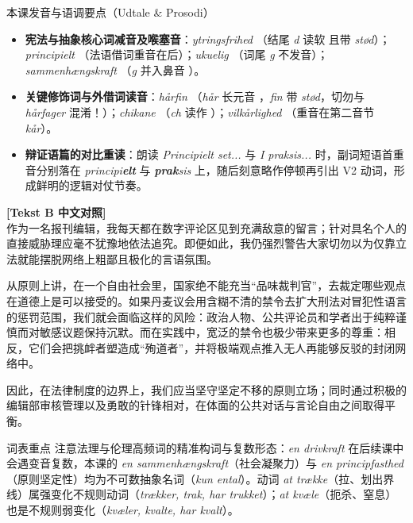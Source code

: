 \begin{tipbox}{本课发音与语调要点（Udtale \& Prosodi）}
\begin{itemize}
  \item \textbf{宪法与抽象核心词减音及喉塞音}：\textit{ytringsfrihed} （结尾 \textit{d} 读软  且带 \textit{stød}）；\textit{principielt} （法语借词重音在后）；\textit{ukuelig} （词尾 \textit{g} 不发音）；\textit{sammenhængskraft} （\textit{g} 并入鼻音 ）。
  \item \textbf{关键修饰词与外借词读音}：\textit{hårfin} （\textit{hår} 长元音 ，\textit{fin} 带 \textit{stød}，切勿与 \textit{hårfager} 混淆！）；\textit{chikane} （\textit{ch} 读作 ）；\textit{vilkårlighed} （重音在第二音节 \textit{kår}）。
  \item \textbf{辩证语篇的对比重读}：朗读 \textit{Principielt set...} 与 \textit{I praksis...} 时，副词短语首重音分别落在 \textit{principi\textbf{elt}} 与 \textit{\textbf{prak}sis} 上，随后刻意略作停顿再引出 V2 动词，形成鲜明的逻辑对仗节奏。
\end{itemize}
\end{tipbox}

\begin{transbox}
\small
\textbf{\color{NCDTeal}[Tekst B 中文对照]}\\
作为一名报刊编辑，我每天都在数字评论区见到充满敌意的留言；针对具名个人的直接威胁理应毫不犹豫地依法追究。即便如此，我仍强烈警告大家切勿以为仅靠立法就能摆脱网络上粗鄙且极化的言语氛围。

从原则上讲，在一个自由社会里，国家绝不能充当“品味裁判官”，去裁定哪些观点在道德上是可以接受的。如果丹麦议会用含糊不清的禁令去扩大刑法对冒犯性语言的惩罚范围，我们就会面临这样的风险：政治人物、公共评论员和学者出于纯粹谨慎而对敏感议题保持沉默。而在实践中，宽泛的禁令也极少带来更多的尊重：相反，它们会把挑衅者塑造成“殉道者”，并将极端观点推入无人再能够反驳的封闭网络中。

因此，在法律制度的边界上，我们应当坚守坚定不移的原则立场；同时通过积极的编辑部审核管理以及勇敢的针锋相对，在体面的公共对话与言论自由之间取得平衡。
\end{transbox}


\begin{tipbox}{词表重点}
注意法理与伦理高频词的精准构词与复数形态：\textit{en drivkraft} 在后续课中会遇变音复数，本课的 \textit{en sammenhængskraft}（社会凝聚力）与 \textit{en principfasthed}（原则坚定性）均为不可数抽象名词（\textit{kun ental}）。动词 \textit{at trække}（拉、划出界线）属强变化不规则动词（\textit{trækker, trak, har trukket}）；\textit{at kvæle}（扼杀、窒息）也是不规则弱变化（\textit{kvæler, kvalte, har kvalt}）。
\end{tipbox}

